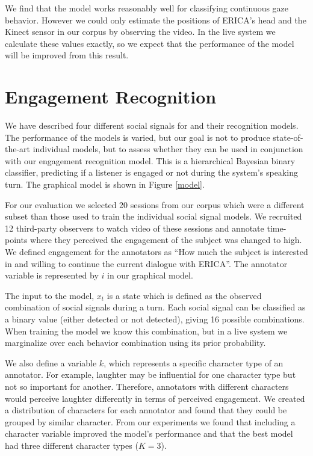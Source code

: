 \documentclass[letterpaper]{article} %
\begin{document}
We find that the model works reasonably well for classifying continuous gaze behavior. However we could only estimate the positions of ERICA's head and the Kinect sensor in our corpus by observing the video. In the live system we calculate these values exactly, so we expect that the performance of the model will be improved from this result.

\section{Engagement Recognition}
We have described four different social signals for and their recognition models. The performance of the models is varied, but our goal is not to produce state-of-the-art individual models, but to assess whether they can be used in conjunction with our engagement recognition model. This is a hierarchical Bayesian binary classifier, predicting if a listener is engaged or not during the system's speaking turn. The graphical model is shown in Figure \ref{model}.

For our evaluation we selected 20 sessions from our corpus which were a different subset than those used to train the individual social signal models. We recruited 12 third-party observers to watch video of these sessions and annotate time-points where they perceived the engagement of the subject was changed to high. We defined engagement for the annotators as ``How much the subject is interested in and willing to continue the current dialogue with ERICA''. The annotator variable is represented by $i$ in our graphical model.

The input to the model, $x_t$ is a state which is defined as the observed combination of social signals during a turn. Each social signal can be classified as a binary value (either detected or not detected), giving 16 possible combinations. When training the model we know this combination, but in a live system we marginalize over each behavior combination using its prior probability.

We also define a variable $k$, which represents a specific character type of an annotator. For example, laughter may be influential for one character type but not so important for another. Therefore, annotators with different characters would perceive laughter differently in terms of perceived engagement. We created a distribution of characters for each annotator and found that they could be grouped by similar character. From our experiments we found that including a character variable improved the model's performance and that the best model had three different character types ($K=3$).
\end{document}
